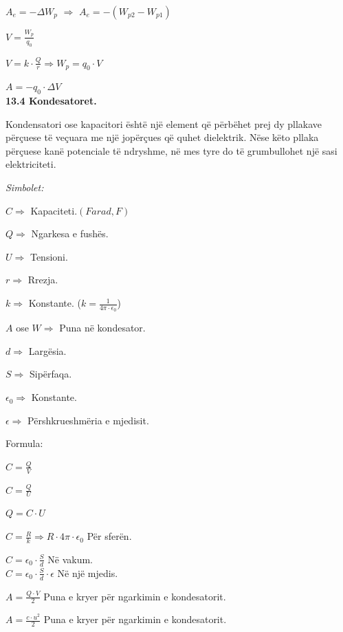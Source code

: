 \documentclass[twocolumn]{article}
\begin{document}
	$A_e=-\Delta W_p$ $\Rightarrow$  $A_e=-(W_{p2}-W_{p1})$
	
	$V=\frac{W_p}{q_0}$
	
	$V=k \cdot \frac{Q}{r} \Rightarrow W_p=q_0 \cdot V$
	
	$A=-q_0 \cdot \Delta V$\\
	
	
	\textbf{13.4 Kondesatoret.}
	
	Kondensatori ose kapacitori është një element që përbëhet prej dy pllakave përçuese të veçuara me një jopërçues që quhet dielektrik. Nëse këto pllaka përçuese kanë potenciale të ndryshme, në mes tyre do të grumbullohet një sasi elektriciteti. 
	
	\begin{center}
		\textit{Simbolet:}
	\end{center}
	
	$C \Rightarrow $ Kapaciteti.$(Farad,F)$
	
	$Q \Rightarrow$ Ngarkesa e fushës.
	
	$U \Rightarrow $ Tensioni.
	
	$r \Rightarrow$ Rrezja.
	
	$k \Rightarrow $ Konstante. ($k=\frac{1}{4 \pi \cdot \epsilon_0}$)  
	
	$A$ ose $W \Rightarrow $ Puna në kondesator.
	
	$d \Rightarrow $ Largësia.
	
	$S \Rightarrow $ Sipërfaqa.
	
	$\epsilon_0 \Rightarrow$ Konstante.
	
	$\epsilon \Rightarrow $ Përshkrueshmëria e mjedisit.
	
	
	
	\begin{center}
		Formula:
	\end{center}
	
	$C=\frac{Q}{V}$
	
	$C=\frac{Q}{U}$
	
	$Q=C \cdot U$
	
	$C=\frac{R}{k}\Rightarrow R \cdot 4\pi \cdot \epsilon_0$ Për sferën.
	
	$C=\epsilon_0 \cdot \frac{S}{d}$ Në vakum.\\
	
	
	$C=\epsilon_0 \cdot \frac{S}{d} \cdot \epsilon$ Në një mjedis.
	
	$A=\frac{Q\cdot V}{2}$ Puna e kryer për ngarkimin e kondesatorit.
	
	$A=\frac{c \cdot u^2}{2}$ Puna e kryer për ngarkimin e kondesatorit.
	
\end{document}
